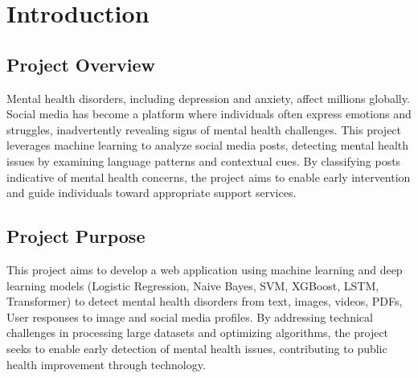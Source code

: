 
\section{Introduction}

\begin{comment}
    Briefly introduce the project's overall topic and purpose.
    \vspace{.1in}
    
    \noindent
    Provide specifications of Technical domain (Hardware, Operating System, Software) and Business domain.
    \vspace{.1in}
    
    \noindent
    Provide \textbf{Glossary} / Keywords in a tabular format.
\end{comment}


\subsection{Project Overview}
\vspace{.1in}
\noindent
Mental health disorders, including depression and anxiety, affect millions globally. Social media has become a platform where individuals often express emotions and struggles, inadvertently revealing signs of mental health challenges. This project leverages machine learning to analyze social media posts, detecting mental health issues by examining language patterns and contextual cues. By classifying posts indicative of mental health concerns, the project aims to enable early intervention and guide individuals toward appropriate support services.

\subsection{Project Purpose}
\vspace{.1in}
\noindent
This project aims to develop a web application using machine learning and deep learning models (Logistic Regression, Naive Bayes, SVM, XGBoost, LSTM, Transformer) to detect mental health disorders from text, images, videos, PDFs, User responses to image and social media profiles. By addressing technical challenges in processing large datasets and optimizing algorithms, the project seeks to enable early detection of mental health issues, contributing to public health improvement through technology.

